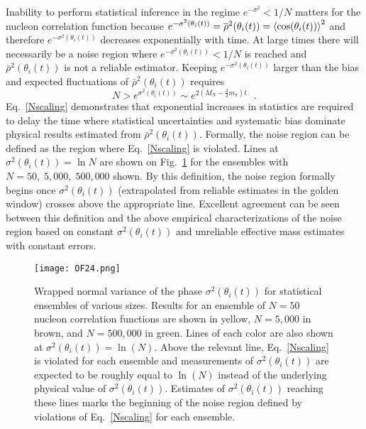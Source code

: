 Inability to perform statistical inference in the regime $e^{-\sigma^2} < 1/N$ matters for the nucleon correlation 
function because $e^{-\sigma^2(\theta_i(t))} = \overline{\rho}^2(\theta_i(t))= \left< \cos(\theta_i(t)) \right>^2$ and therefore $e^{-\sigma^2(\theta_i(t))}$ 
decreases exponentially with time. 
At large times there will necessarily be a noise region where $e^{-\sigma^2(\theta_i(t))} < 1/N$ is reached and $\bar{\rho}^2(\theta_i(t))$ 
is not a reliable estimator.
Keeping $e^{-\sigma^2(\theta_i(t))}$ larger than the bias and expected fluctuations of $\bar{\rho}^2(\theta_i(t))$ requires
%
\begin{equation}
  N > e^{\sigma^2(\theta_i(t))} \sim e^{2\left( M_N - \frac{3}{2}m_\pi \right)t}
  \ \ \ .
  \label{Nscaling}
\end{equation}
%
Eq.~\eqref{Nscaling} demonstrates that exponential increases in statistics are required to delay the time where statistical uncertainties 
and systematic bias dominate physical results estimated from $\bar{\rho}^2(\theta_i(t))$. 
Formally, the noise region can be defined as the region where Eq.~\eqref{Nscaling} is violated. 
Lines at $\sigma^2(\theta_i(t)) = \ln N$ are shown on Fig.~\ref{ThWNAll} for the ensembles with $N=50,\;5,000,\;500,000$ shown. 
By this definition, the noise region formally begins once $\sigma^2(\theta_i(t))$
 (extrapolated from reliable estimates in the golden window) crosses above the appropriate line. 
 Excellent agreement can be seen between this definition and the above empirical characterizations of the 
 noise region based on constant $\sigma^2(\theta_i(t))$ and unreliable effective mass estimates with constant errors.
%
\begin{figure}[!ht]
  \centering
  \texttt{[image: OF24.png]}
  \caption{
  Wrapped normal variance of the phase $\sigma^2(\theta_i(t))$ for statistical ensembles of various sizes. 
  Results for an ensemble of $N=50$ nucleon correlation functions are shown in yellow, 
  $N=5,000$ in brown, and $N=500,000$ in green. 
  Lines of each color are also shown at $\sigma^2(\theta_i(t)) = \ln(N)$. 
  Above the relevant line, Eq.~\eqref{Nscaling} is violated for each ensemble and measurements of $\sigma^2(\theta_i(t))$ 
  are expected to be roughly equal to $\ln(N)$ instead of the underlying physical value of $\sigma^2(\theta_i(t))$. 
  Estimates of $\sigma^2(\theta_i(t))$ reaching these lines marks the beginning of the noise region defined by 
  violations of Eq.~\eqref{Nscaling} for each ensemble.}
  \label{ThWNAll}
\end{figure}
%



